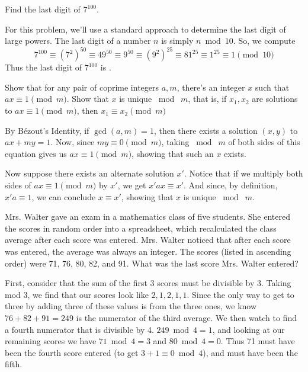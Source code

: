 \begin{problem}
    Find the last digit of $7^{100}$.
\end{problem}

\begin{solution}
    For this problem, we'll use a standard approach to determine the last digit of large powers. The last digit of a number $n$ is simply $n \bmod{10}$. So, we compute
    \[
        7^{100} \equiv (7^2)^{50} \equiv 49^{50} \equiv 9^{50} \equiv (9^2)^{25} \equiv 81^{25} \equiv 1^{25} \equiv 1 \pmod {10}
    \]
    Thus the last digit of $7^{100}$ is .
\end{solution}

\begin{problem}
    Show that for any pair of coprime integers $a,m$, there's an integer $x$ such that $ax \equiv 1 \pmod m$. Show that $x$ is unique $\bmod\;m$, that is, if $x_1, x_2$ are solutions to $ax \equiv 1 \pmod m$, then $x_1 \equiv x_2 \pmod m$
\end{problem}

\begin{solution}
    By Bézout’s Identity, if $\gcd(a,m)=1$, then there exists a solution $(x,y)$ to $ax+my = 1$. Now, since $my \equiv 0\pmod m$, taking $\bmod\;m$ of both sides of this equation gives us \(ax \equiv 1 \pmod m\), showing that such an $x$ exists. 

    Now suppose there exists an alternate solution $x'$. Notice that if we multiply both sides of \(ax \equiv 1 \pmod m\) by \(x'\), we get 
    \(x'ax \equiv x'\). And since, by definition, \(x'a \equiv 1\), we can conclude \(x \equiv x'\), showing that $x$ is unique $\bmod\;m$.
\end{solution}

\begin{problem}[M][3][AMC 12 2000/9]
    Mrs. Walter gave an exam in a mathematics class of five students. She entered the scores in random order into a spreadsheet, which recalculated the class average after each score was entered. Mrs. Walter noticed that after each score was entered, the average was always an integer. The scores (listed in ascending order) were 71, 76, 80, 82, and 91. What was the last score Mrs. Walter entered?
\end{problem}

\begin{solution}
    First, consider that the sum of the first 3 scores must be divisible by 3. Taking mod 3, we find that our scores look like $2, 1, 2, 1, 1$. Since the only way to get to three by adding three of these values is from the three ones, we know $76+82+91 = 249$ is the numerator of the third average. We then watch to find a fourth numerator that is divisible by 4. $249 \bmod{4} = 1$, and looking at our remaining scores we have $71 \bmod{4} = 3$ and $80 \bmod{4} = 0$. Thus 71 must have been the fourth score entered (to get $3+1\equiv0 \bmod{4}$), and  must have been the fifth.
\end{solution}


